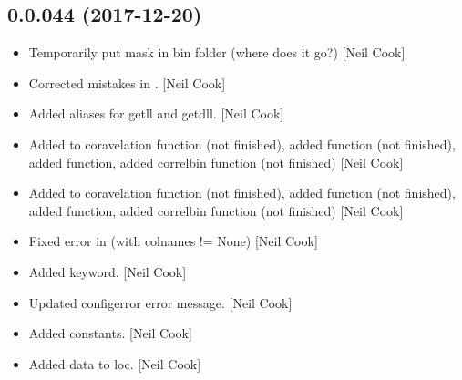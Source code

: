 \documentclass[a4paper,10pt,english]{report}
\begin{document}
\subsection{0.0.044 (2017-12-20)}
\label{\detokenize{misc/changelog:id507}}\begin{itemize}
\item {} 
Temporarily put mask in bin folder (where does it go?) {[}Neil Cook{]}

\item {} 
Corrected mistakes in . {[}Neil Cook{]}

\item {} 
Added aliases for getll and getdll. {[}Neil Cook{]}

\item {} 
Added to coravelation function (not finished), added 
function (not finished), added  function, added correlbin
function (not finished) {[}Neil Cook{]}

\item {} 
Added to coravelation function (not finished), added 
function (not finished), added  function, added correlbin
function (not finished) {[}Neil Cook{]}

\item {} 
Fixed error in  (with colnames != None) {[}Neil Cook{]}

\item {} 
Added keyword. {[}Neil Cook{]}

\item {} 
Updated configerror error message. {[}Neil Cook{]}

\item {} 
Added constants. {[}Neil Cook{]}

\item {} 
Added data to loc. {[}Neil Cook{]}

\end{itemize}
\end{document}
